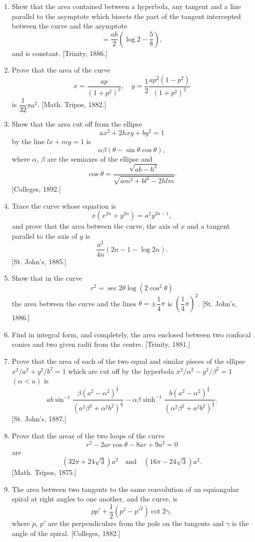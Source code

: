 \documentclass[11pt, a4paper]{article}
\newcommand{\source}[1]{\hfill\textnormal{[#1]}}
\begin{document}
\begin{enumerate}[leftmargin=2em]
\item Show that the area contained between a hyperbola, any tangent and a line parallel to the asymptote which bisects the part of the tangent intercepted between the curve and the asymptote
\[
=\frac{ab}{2}\left(\log2-\frac58\right),
\]
and is constant. \source{Trinity, 1886.}

\item Prove that the area of the curve
\[
x=\frac{ap}{(1+p^2)^2},\quad y=\frac12\frac{ap^2(1-p^2)}{(1+p^2)^2}
\]
is $\dfrac{1}{32}\pi a^2$. \source{Math. Tripos, 1882.}

\item Show that the area cut off from the ellipse
\[
ax^2+2hxy+by^2=1
\]
by the line $lx+my=1$ is
\[
\alpha\beta(\theta-\sin\theta\cos\theta),
\]
where $\alpha$, $\beta$ are the semiaxes of the ellipse and
\[
\cos\theta=\frac{\sqrt{ab-h^2}}{\sqrt{am^2+bl^2-2hlm}}.
\]
\source{Colleges, 1892.}

\item Trace the curve whose equation is
\[
x(x^{2n}+y^{2n})=a^2y^{2n-1},
\]
and prove that the area between the curve, the axis of $x$ and a tangent parallel to the axis of $y$ is
\[
\frac{a^2}{4n}(2n-1-\log2n).
\]
\source{St. John's, 1885.}

\item Show that in the curve
\[
r^2=\sec2\theta\log(2\cos^2\theta)
\]
the area between the curve and the lines $\theta=\pm\dfrac14\pi$ is $\left(\dfrac14\pi\right)^2$. \source{St. John's, 1886.}

\item Find in integral form, and completely, the area enclosed between two confocal conics and two given radii from the centre. \source{Trinity, 1881.}

\item Prove that the area of each of the two equal and similar pieces of the ellipse $x^2/a^2+y^2/b^2=1$ which are cut off by the hyperbola $x^2/\alpha^2-y^2/\beta^2=1$ $(\alpha<a)$ is
\[
ab\sin^{-1}\frac{\beta(a^2-\alpha^2)^{\frac12}}{(a^2\beta^2+\alpha^2b^2)^{\frac12}}-\alpha\beta\sinh^{-1}\frac{b(a^2-\alpha^2)^{\frac12}}{(\alpha^2\beta^2+a^2b^2)^{\frac12}}.
\]
\source{St. John's, 1887.}

\item Prove that the areas of the two loops of the curve
\[
r^2-2ar\cos\theta-8ar+9a^2=0
\]
are
\[
(32\pi+24\sqrt3)a^2\quad\text{and}\quad(16\pi-24\sqrt3)a^2.
\]
\source{Math. Tripos, 1875.}

\item The area between two tangents to the same convolution of an equiangular spiral at right angles to one another, and the curve, is
\[
pp'+\frac12(p^2-p'^2)\cot2\gamma,
\]
where $p$, $p'$ are the perpendiculars from the pole on the tangents and $\gamma$ is the angle of the spiral. \source{Colleges, 1882.}


\end{enumerate}
\end{document}
